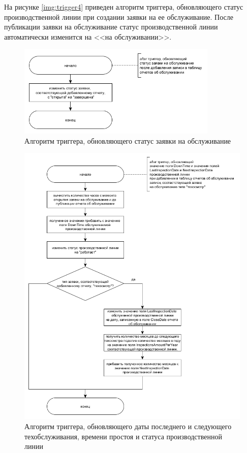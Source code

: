 На рисунке \ref{img:trigger4} приведен алгоритм триггера, обновляющего статус производственной линии при создании заявки на ее обслуживание. После публикации заявки на обслуживание статус производственной линии автоматически изменится на <<на обслуживании>>.


\begin{figure}[H]
    \centering
    \includegraphics[width=0.85\textwidth]{templates/coursework/inc/img/trigger2.png}
    \caption{Алгоритм триггера, обновляющего статус заявки на обслуживание}
    \label{img:trigger2}
\end{figure}

\begin{figure}[H]
    \centering
    \includegraphics[width=1\textwidth]{templates/coursework/inc/img/trigger3.png}
    \caption{Алгоритм триггера, обновляющего даты последнего и следующего техобслуживания, времени простоя и статуса производственной линии}
    \label{img:trigger3}
\end{figure}

